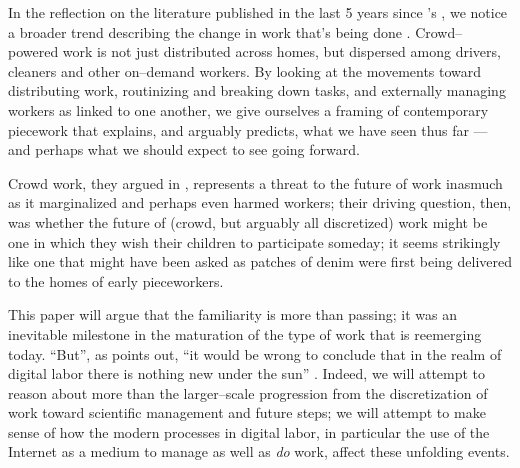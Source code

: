 \documentclass{sigchi}
\begin{document}

In the reflection on the literature published in the last 5 years since
\citeauthor{crowdworkFuture}'s 
,
we notice a broader trend describing the change in work that's being done
\cite{crowdworkFuture}.
Crowd--powered work is not just distributed across homes,
but dispersed among drivers, cleaners and other on--demand workers.
By looking at the movements toward
distributing work,
routinizing and breaking down tasks,
and externally managing workers
as linked to one another, 
we give ourselves a framing of contemporary piecework that explains,
and arguably predicts,
what we have seen thus far
--- and perhaps what we should expect to see going forward.



Crowd work,
they argued in \citeyear{crowdworkFuture},
represents a threat to the future of work inasmuch as it marginalized
and perhaps even harmed
workers;
their driving question, then, was
whether the future of
(crowd, but arguably all discretized)
work might be one in which they wish their children to participate someday;
it seems strikingly like one that might have been asked
as patches of denim were first being delivered to the homes of early pieceworkers.

This paper will argue that the familiarity is more than passing;
it was an inevitable milestone in the maturation of the type of work that is reemerging today.
``But'',
as \citeauthor{scholz2012digital} points out,
``it would be wrong to conclude that
in the realm of digital labor there is nothing new under the sun''
\cite{scholz2012digital}.
Indeed, we will attempt to reason about more than the larger--scale progression from
the discretization of work toward scientific management and future steps;
we will attempt to make sense of how the modern processes in digital labor,
in particular the use of the Internet as a medium to manage as well as \textit{do} work,
affect these unfolding events.
\end{document}
